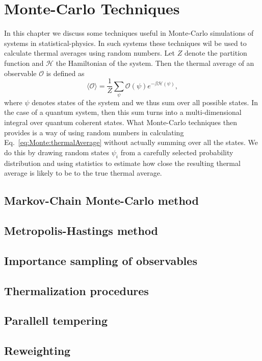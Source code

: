 \chapter{Monte-Carlo Techniques}

In this chapter we discuss some techniques useful in Monte-Carlo simulations
of systems in statistical-physics.
In such systems these techniques wil be used to calculate thermal averages using random numbers. Let
$Z$ denote the partition function and $\mathcal{H}$ the Hamiltonian of the system. Then the thermal
average of an observable $\mathcal{O}$ is defined as
\begin{equation}
    \label{eq:Monte:thermalAverage}
    \langle\mathcal{O}\rangle = \frac{1}{Z}\sum_\psi\mathcal{O}(\psi)e^{-\beta\mathcal{H}(\psi)},
\end{equation}
where $\psi$ denotes states of the system and we thus sum over all possible states. In the case of
a quantum system, then this sum turns into a multi-dimensional integral over quantum coherent states.
What Monte-Carlo techniques then provides is a way of using random numbers in calculating
Eq.~\eqref{eq:Monte:thermalAverage} without actually summing over all the states. We do this by drawing random states
$\psi_i$ from a carefully selected probability distribution and using statistics to estimate how close the resulting
thermal average is likely to be to the true thermal average.

\section{Markov-Chain Monte-Carlo method}

\section{Metropolis-Hastings method}

\section{Importance sampling of observables}

\section{Thermalization procedures}

\section{Parallell tempering}

\section{Reweighting}
